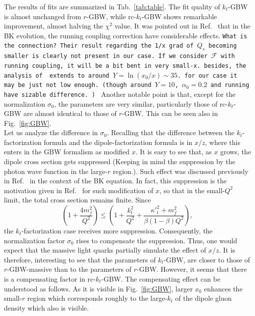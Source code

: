 \documentclass[12pt]{article}
\numberwithin{equation}{section}
\numberwithin{table}{section}
\numberwithin{figure}{section}
\newcommand{\comment}[1]{\texttt{\color{red}#1}}
\begin{document}
The results of fits are summarized in Tab.~\ref{tab:table}. 
The fit quality of $k_t$-GBW is almost unchanged from $r$-GBW, while rc-$k_t$-GBW shows remarkable improvement, almost halving the $\chi^2$ value.
It was pointed out in Ref.~\cite{Albacete:2004gw,Albacete:2007yr,Albacete:2010sy} that in the BK evolution, the running coupling correction have considerable effects. \comment{What is the connection? Their result regarding the 1/x grad of $Q_s$ becoming smaller is clearly not present in our case. If we consider $\mathcal{F}$ with running coupling, it will be a bit bent in very small-x. besides, the analysis of \cite{Albacete:2004gw} extends to around $Y=\ln(x_0/x)\sim35$. for our case it may be just not low enough. (though around $Y=10$, $\alpha_0=0.2$ and running have sizable difference. ) }
Another notable point is that, except for the normalization $\sigma_0$, the parameters are very similar, particularly those of rc-$k_t$-GBW are almost identical to those of $r$-GBW. This can be seen also in Fig.~\ref{fig:GBW}. \\
Let us analyze the difference in $\sigma_0$. 
Recalling that the difference between the $k_t$-factorization formula and the dipole-factorization formula is in $x/z$, where this enters in the GBW formalism as modified $x$. It is easy to see that, as $x$ grows, the dipole cross section gets suppressed (Keeping in mind the suppression by the photon wave function in the large-$r$ region.). Such effect was discussed previously in Ref.~\cite{Kutak:2004ym} in the context of the BK equation. In fact, this suppression is the motivation given in Ref.~\cite{Golec-Biernat:1998zce} for such modification of $x$, so that in the small-$Q^2$ limit, the total cross section remains finite.    
Since 
\begin{equation}
\left(1+\frac{4 m_f^2}{Q^2}\right)\leq\left(1+\frac{k_t^2}{Q^2}+\frac{{\kappa'}_t^2+m_f^2}{\beta(1-\beta)Q^2}\right),
\end{equation}
the $k_t$-factorization case receives more suppression. Consequently, the normalization factor $\sigma_0$ rises to compensate the suppression. Thus, one would expect that the massive light quarks partially simulate the effect of $x/z$.
It is therefore, interesting to see that the parameters of $k_t$-GBW, are closer to those of $r$-GBW-massive than to the parameters of $r$-GBW.    
However, it seems that there is a compensating factor in rc-$k_t$-GBW. 
The compensating effect can be understood as follows. As it is visible in  Fig.~\ref{fig:GBW}, larger $x_0$ enhances the small-$r$ region which corresponds roughly to the large-$k_t$ of the dipole gluon density which also is visible. 
\end{document}
